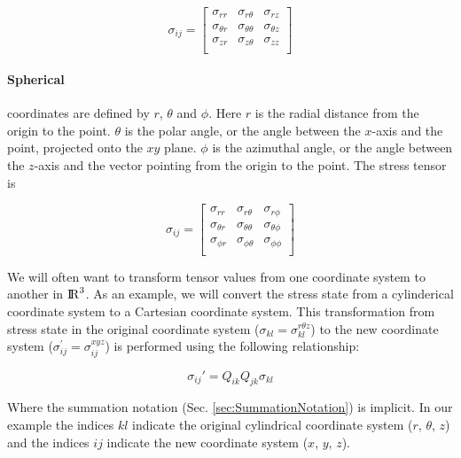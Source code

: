 \begin{equation}
	\sigma_{ij}=
	\begin{bmatrix}
		\sigma_{rr} & \sigma_{r \theta} & \sigma_{r z}\\
    \sigma_{\theta r} & \sigma_{\theta\theta} & \sigma_{\theta z}\\
    \sigma_{z r} & \sigma_{z \theta} & \sigma_{zz}\\
	\end{bmatrix}
	\label{eq:CylindricalStressTensor}
\end{equation}

\paragraph{Spherical} coordinates are defined by $r$, $\theta$ and $\phi$. Here $r$ is the radial distance from the origin to the point. $\theta$ is the polar angle, or the angle between the $x$-axis and the point, projected onto the $xy$ plane. $\phi$ is the azimuthal angle, or the angle between the $z$-axis and the vector pointing from the origin to the point. The stress tensor is

\begin{equation}
	\sigma_{ij}=
	\begin{bmatrix}
		\sigma_{rr} & \sigma_{r \theta} & \sigma_{r \phi}\\
    \sigma_{\theta r} & \sigma_{\theta\theta} & \sigma_{\theta \phi}\\
    \sigma_{\phi r} & \sigma_{\phi \theta} & \sigma_{\phi\phi}\\
	\end{bmatrix}
	\label{eq:SphericalStressTensor}
\end{equation}

We will often want to transform tensor values from one coordinate system to another in ${\rm I\!R}^3$. As an example, we will convert the stress state from a cylinderical coordinate system to a Cartesian coordinate system. This transformation from stress state in the original coordinate system ($\sigma_{kl
} = \sigma_{kl}^{r \theta z}$) to the new coordinate system ($\sigma_{ij
}^{'} = \sigma_{ij}^{xyz}$) is performed using the following relationship:

\begin{equation}
	\sigma_{ij}' = Q_{ik}Q_{jk}\sigma_{kl}
	\label{eq:GeneralTransform}
\end{equation}

Where the summation notation (Sec. \ref{sec:SummationNotation}) is implicit. In our example the indices $kl$ indicate the original cylindrical coordinate system ($r$, $\theta$, $z$) and the indices $ij$ indicate the new coordinate system ($x$, $y$, $z$).

